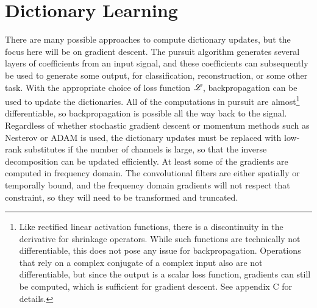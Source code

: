 \section{Dictionary Learning}
There are many possible approaches to compute dictionary updates, but the focus here will be on gradient descent. The pursuit algorithm generates several layers of coefficients from an input signal, and these coefficients can subsequently be used to generate some output, for classification, reconstruction, or some other task. With the appropriate choice of loss function $\mathscr{L}$, backpropagation can be used to update the dictionaries. All of the computations in pursuit are almost\footnote{Like rectified linear activation functions, there is a discontinuity in the derivative for shrinkage operators. While such functions are technically not differentiable, this does not pose any issue for backpropagation. Operations that rely on a complex conjugate of a complex input also are not differentiable, but since the output is a scalar loss function, gradients can still be computed, which is sufficient for gradient descent. See appendix C for details.} differentiable, so backpropagation is possible all the way back to the signal. Regardless of whether stochastic gradient descent or momentum methods such as Nesterov \cite{sutskever2013importance} or ADAM \cite{kingma2017adam} is used, the dictionary updates must be replaced with low-rank substitutes if the number of channels is large, so that the inverse decomposition can be updated efficiently. At least some of the gradients are computed in frequency domain. The convolutional filters are either spatially or temporally bound, and the frequency domain gradients will not respect that constraint, so they will need to be transformed and truncated.

